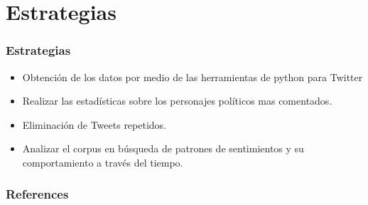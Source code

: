 \documentclass{beamer}
\begin{document}
\section{Estrategias}
\begin{frame}
    \frametitle{Estrategias}    

    \begin{itemize}
        \item Obtención de los datos por medio de las herramientas de python para Twitter

        \item Realizar las estadísticas sobre los personajes políticos mas comentados.

        \item Eliminación de Tweets repetidos.
        
        \item Analizar el corpus en búsqueda de patrones de sentimientos y su comportamiento a través del tiempo.
    \end{itemize}
\end{frame}


\begin{frame}[allowframebreaks]
    \frametitle{References}
    
    
\end{frame}
\end{document}
